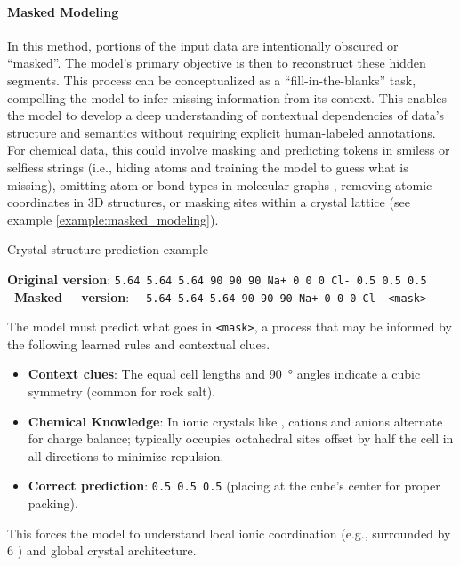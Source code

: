 \paragraph{Masked Modeling}  In this method, portions of the input data are intentionally obscured or \enquote{masked}. 
The model's primary objective is then to reconstruct these hidden segments. \autocite{devlin2018bert0} 
This process can be conceptualized as a \enquote{fill-in-the-blanks} task, compelling the model to infer missing information from its context. This enables the model to develop a deep understanding of contextual dependencies of data's structure and semantics without requiring explicit human-labeled annotations. For chemical data, this could involve masking and predicting tokens in \glspl{smiles} or \glspl{selfies} strings \autocite{chithrananda2020chemberta, zhang2025scientific} (i.e., hiding atoms and training the model to guess what is missing), omitting atom or bond types in molecular graphs \autocite{mahmood2021masked,wang2022molecular, reiser2022graph}, removing atomic coordinates in 3D structures, or masking sites within a crystal lattice (see example \ref{example:masked_modeling}).

\begin{examplebox}[label={example:masked_modeling}]{Crystal structure prediction example}

\textbf{Original version}: \texttt{5.64 5.64 5.64 90 90 90 Na+ 0 0 0 Cl- 0.5 0.5 0.5}
\textbf{~Masked ~~version}: \texttt{~~5.64 5.64 5.64 90 90 90 Na+ 0 0 0 Cl- \textless{}mask\textgreater{}}

The model must predict what goes in \texttt{\textless{}mask\textgreater{}}, a process that may be informed by the following learned rules and contextual clues.

\begin{itemize}
    \item \textbf{Context clues}: The equal cell lengths and  \SI{90}{\degree} angles indicate a cubic symmetry (common for rock salt).
    \item \textbf{Chemical Knowledge}: In ionic crystals like , cations and anions alternate for charge balance;  typically occupies octahedral sites offset by half the cell in all directions to minimize repulsion.
    \item \textbf{Correct prediction}: \texttt{0.5 0.5 0.5} (placing  at the cube's center for proper packing).
\end{itemize}

This forces the model to understand local ionic coordination (e.g.,  surrounded by 6 ) and global crystal architecture.
\end{examplebox}

